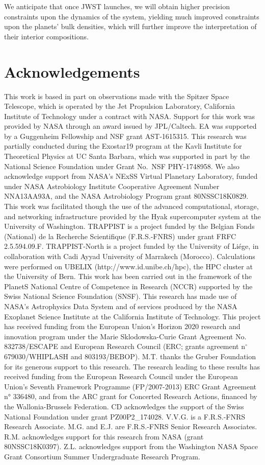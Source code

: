 \documentclass[twocolumn]{aastex63}
\begin{document}
We anticipate that once JWST launches, we will obtain higher precision constraints upon the dynamics of the system, yielding much improved constraints upon the planets' bulk densities, which will further improve the interpretation of their interior compositions.

\section*{Acknowledgements}

This work is based in part on observations made with the Spitzer Space Telescope, which
is operated by the Jet Propulsion Laboratory, California Institute of Technology under
a contract with NASA. Support for this work was provided by NASA through an award issued
by JPL/Caltech.  EA was supported by a Guggenheim Fellowship and NSF grant AST-1615315.
This research was partially conducted during the Exostar19 program at the Kavli Institute 
for Theoretical Physics at UC Santa Barbara, which was supported in part by the National
Science Foundation under Grant No.\ NSF PHY-1748958.
We also acknowledge support from NASA's NExSS Virtual Planetary Laboratory, funded under
NASA Astrobiology Institute Cooperative Agreement Number NNA13AA93A, and the NASA Astrobiology
Program grant 80NSSC18K0829.
This work was facilitated though the use of the advanced computational, storage, and
networking infrastructure provided by the Hyak supercomputer system at the University of
Washington. TRAPPIST is a project funded by the Belgian Fonds (National) de la Recherche 
Scientifique (F.R.S.-FNRS) under grant FRFC 2.5.594.09.F. TRAPPIST-North is a project funded 
by the University of Li\'ege, in collaboration with Cadi Ayyad University of Marrakech (Morocco).
Calculations were performed on UBELIX (http://www.id.unibe.ch/hpc), the HPC
cluster at the University of Bern. This work has been carried out in the framework of the PlanetS National Centre
of Competence in Research (NCCR) supported by the Swiss National Science Foundation (SNSF).
This research has made use of NASA's Astrophysics Data System and of services produced by
the NASA Exoplanet Science Institute at the California Institute of Technology.
This project has received funding from the European Union's Horizon 2020 research and
innovation program under the Marie Sklodowska-Curie Grant Agreement No. 832738/ESCAPE and European Research Council (ERC; grants agreement n$^\circ$ 679030/WHIPLASH and 803193/BEBOP). M.T.
thanks the Gruber Foundation for its generous support to this research.
The research leading to these results has received funding from the European Research Council
under the European Union's Seventh Framework Programme (FP/2007-2013) ERC Grant
Agreement n° 336480, and from the ARC grant for Concerted Research Actions, financed by the
Wallonia-Brussels Federation. CD acknowledges the support of the Swiss National Foundation under grant PZ00P2\_174028. V.V.G. is a F.R.S.-FNRS Research Associate. M.G. and E.J. are F.R.S.-FNRS Senior Research Associates. R.M. acknowledges support for this research from NASA (grant 80NSSC18K0397). Z.L. acknowledges support from the Washington NASA Space Grant Consortium Summer Undergraduate Research Program.
\end{document}
